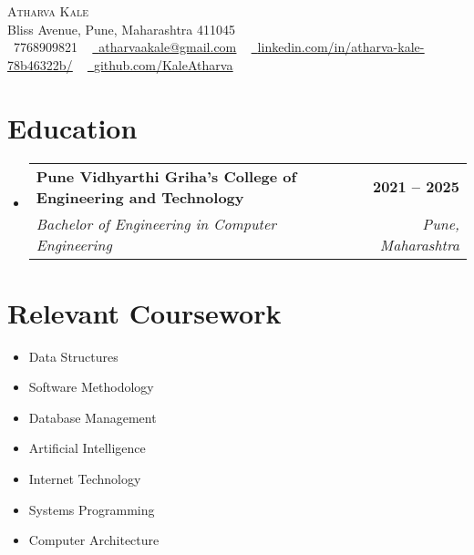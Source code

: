 \documentclass[letterpaper,11pt]{article}
\makeatletter
\newcommand{\resumeSubheading}[4]{
  \vspace{-2pt}\item
    \begin{tabular*}{1.0\textwidth}[t]{l@{\extracolsep{\fill}}r}
      \textbf{#1} & \textbf{\small #2} \\
      \textit{\small#3} & \textit{\small #4} \\
    \end{tabular*}\vspace{-7pt}
}
\newcommand{\resumeSubHeadingListStart}{\begin{itemize}[leftmargin=0.0in, label={}]}
\newcommand{\resumeSubHeadingListEnd}{\end{itemize}}
\makeatother
\begin{document}

\begin{center}
    {\Huge \scshape Atharva Kale} \\ \vspace{1pt}
    Bliss Avenue, Pune, Maharashtra 411045 \\ \vspace{1pt}
    \small \raisebox{-0.1\height}\faPhone\ 7768909821 ~ \href{mailto:atharvaakale@gmail.com}{\raisebox{-0.2\height}\faEnvelope\  \underline{atharvaakale@gmail.com}} ~ 
    \href{https://www.linkedin.com/in/atharva-kale-78b46322b/}{\raisebox{-0.2\height}\faLinkedin\ \underline{linkedin.com/in/atharva-kale-78b46322b/}}  ~
    \href{https://github.com/KaleAtharva}{\raisebox{-0.2\height}\faGithub\ \underline{github.com/KaleAtharva}}
    \vspace{-8pt}
\end{center}


\section{Education}
  \resumeSubHeadingListStart
    \resumeSubheading
      {Pune Vidhyarthi Griha's College of Engineering and Technology}{2021 -- 2025}
      {Bachelor of Engineering in Computer Engineering}{Pune, Maharashtra}
  \resumeSubHeadingListEnd

\section{Relevant Coursework}
        \begin{multicols}{4}
            \begin{itemize}[itemsep=-5pt, parsep=3pt]
                \item\small Data Structures
                \item Software Methodology
                \item Database Management
                \item Artificial Intelligence
                \item Internet Technology
                \item Systems Programming
                \item Computer Architecture
            \end{itemize}
        \end{multicols}
        \vspace*{2.0\multicolsep}
\end{document}
